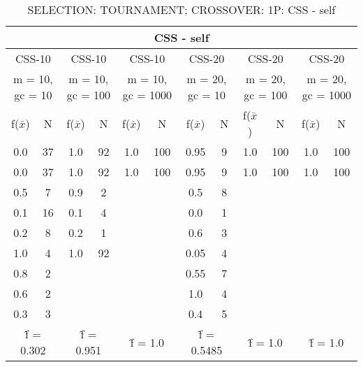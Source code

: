 \begin{table}[H]
	\centering
	\caption{SELECTION: TOURNAMENT; CROSSOVER: 1P: CSS - self}
	\begin{adjustbox}{width=1\textwidth}
		\begin{tabular}{ |c|c||c|c||c|c||c|c||c|c||c|c| }
			\hline
			\multicolumn{12}{|c|}{CSS - self} \\
			\hline
			\multicolumn{2}{|c||}{CSS-10} & \multicolumn{2}{c||}{CSS-10} & \multicolumn{2}{c||}{CSS-10} & \multicolumn{2}{c||}{CSS-20} & \multicolumn{2}{c||}{CSS-20} & \multicolumn{2}{c|}{CSS-20}\\
			\hline
			\multicolumn{2}{|c||}{m = 10, gc = 10} & \multicolumn{2}{c||}{m = 10, gc = 100} & \multicolumn{2}{c||}{m = 10, gc = 1000} & \multicolumn{2}{c||}{m = 20, gc = 10} & \multicolumn{2}{c||}{m = 20, gc = 100} & \multicolumn{2}{c|}{m = 20, gc = 1000}\\
			\hline
			f($\bar{x}$) & N & f($\bar{x}$) & N & f($\bar{x}$) & N & f($\bar{x}$) & N & f($\bar{x}$) & N & f($\bar{x}$) & N\\
			\hline
			\hline
			0.0 & 37 & 1.0 & 92 & 1.0 & 100 & 0.95 & 9 & 1.0 & 100 & 1.0 & 100\\
			\hline
			0.0 & 37 & 1.0 & 92 & 1.0 & 100 & 0.95 & 9 & 1.0 & 100 & 1.0 & 100\\
			0.5 & 7 & 0.9 & 2 &   &   & 0.5 & 8 &   &   &   &  \\
			0.1 & 16 & 0.1 & 4 &   &   & 0.0 & 1 &   &   &   &  \\
			0.2 & 8 & 0.2 & 1 &   &   & 0.6 & 3 &   &   &   &  \\
			1.0 & 4 & 1.0 & 92 &   &   & 0.05 & 4 &   &   &   &  \\
			0.8 & 2 &   &   &   &   & 0.55 & 7 &   &   &   &  \\
			0.6 & 2 &   &   &   &   & 1.0 & 4 &   &   &   &  \\
			0.3 & 3 &   &   &   &   & 0.4 & 5 &   &   &   &  \\
			\hline
			\multicolumn{2}{|c||}{\^{f} = 0.302} & \multicolumn{2}{c||}{\^{f} = 0.951} & \multicolumn{2}{c||}{\^{f} = 1.0} & \multicolumn{2}{c||}{\^{f} = 0.5485} & \multicolumn{2}{c||}{\^{f} = 1.0} & \multicolumn{2}{c|}{\^{f} = 1.0}\\
			\hline
		\end{tabular}
	\end{adjustbox}
\end{table}
